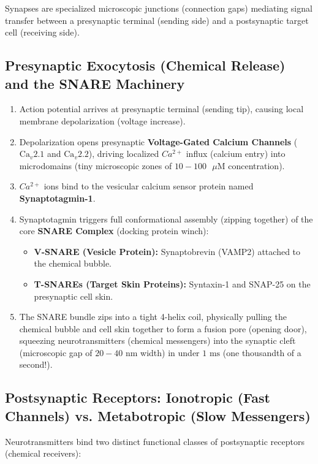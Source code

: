 \documentclass[10pt,journal,compsoc,onecolumn]{IEEEtran}
\begin{document}
Synapses are specialized microscopic junctions (connection gaps) mediating signal transfer between a presynaptic terminal (sending side) and a postsynaptic target cell (receiving side).

\subsection{Presynaptic Exocytosis (Chemical Release) and the SNARE Machinery}

\begin{enumerate}
    \item Action potential arrives at presynaptic terminal (sending tip), causing local membrane depolarization (voltage increase).
    \item Depolarization opens presynaptic \textbf{Voltage-Gated Calcium Channels} ($\text{Ca}_v2.1$ and $\text{Ca}_v2.2$), driving localized $Ca^{2+}$ influx (calcium entry) into microdomains (tiny microscopic zones of $10-100\text{ }\mu\text{M}$ concentration).
    \item $Ca^{2+}$ ions bind to the vesicular calcium sensor protein named \textbf{Synaptotagmin-1}.
    \item Synaptotagmin triggers full conformational assembly (zipping together) of the core \textbf{SNARE Complex} (docking protein winch):
    \begin{itemize}
        \item \textbf{V-SNARE (Vesicle Protein):} Synaptobrevin (VAMP2) attached to the chemical bubble.
        \item \textbf{T-SNAREs (Target Skin Proteins):} Syntaxin-1 and SNAP-25 on the presynaptic cell skin.
    \end{itemize}
    \item The SNARE bundle zips into a tight 4-helix coil, physically pulling the chemical bubble and cell skin together to form a fusion pore (opening door), squeezing neurotransmitters (chemical messengers) into the synaptic cleft (microscopic gap of $20-40\text{ nm}$ width) in under $1\text{ ms}$ (one thousandth of a second!).
\end{enumerate}

\subsection{Postsynaptic Receptors: Ionotropic (Fast Channels) vs. Metabotropic (Slow Messengers)}

Neurotransmitters bind two distinct functional classes of postsynaptic receptors (chemical receivers):
\end{document}
